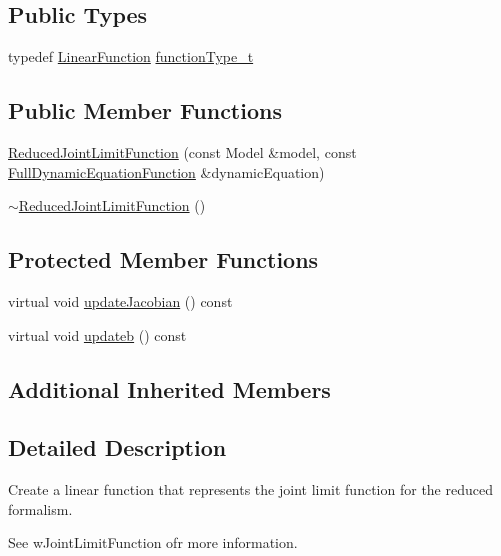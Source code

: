 \subsection*{Public Types}
\begin{DoxyCompactItemize}
\item 
typedef \hyperlink{classocra_1_1LinearFunction}{Linear\+Function} \hyperlink{classocra_1_1ReducedJointLimitFunction_a899e4871502f5e5509349b1f8eb5dfa8}{function\+Type\+\_\+t}
\end{DoxyCompactItemize}
\subsection*{Public Member Functions}
\begin{DoxyCompactItemize}
\item 
\hyperlink{classocra_1_1ReducedJointLimitFunction_afe65f4b9229680de647bb06fd7ae5b44}{Reduced\+Joint\+Limit\+Function} (const Model \&model, const \hyperlink{classocra_1_1FullDynamicEquationFunction}{Full\+Dynamic\+Equation\+Function} \&dynamic\+Equation)
\item 
\hyperlink{classocra_1_1ReducedJointLimitFunction_a96e9196a18c5eb5e92672b45a7491c65}{$\sim$\+Reduced\+Joint\+Limit\+Function} ()
\end{DoxyCompactItemize}
\subsection*{Protected Member Functions}
\begin{DoxyCompactItemize}
\item 
virtual void \hyperlink{classocra_1_1ReducedJointLimitFunction_a3b2b65be504eda131ad8d00304304fd3}{update\+Jacobian} () const
\item 
virtual void \hyperlink{classocra_1_1ReducedJointLimitFunction_aaf30e3ac7c3053707a04a147b545126c}{updateb} () const
\end{DoxyCompactItemize}
\subsection*{Additional Inherited Members}


\subsection{Detailed Description}
Create a linear function that represents the joint limit function for the reduced formalism. 

See w\+Joint\+Limit\+Function ofr more information. 

